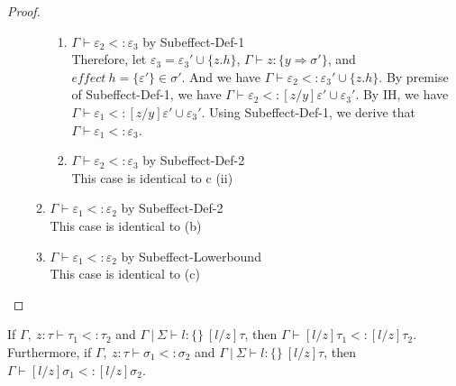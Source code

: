 \begin{proof}
\begin{enumerate}
\begin{enumerate}
\begin{enumerate}
        
        \item $\Gamma \vdash \varepsilon_2 <: \varepsilon_3$ by Subeffect-Def-1\\
        Therefore, let $\varepsilon_3 = \varepsilon_3' \cup \{z.h\}$, $\Gamma \vdash z:\{y \Rightarrow \sigma'\}$, and $effect\ h = \{\varepsilon'\} \in \sigma'$. And we have $\Gamma \vdash \varepsilon_2 <: \varepsilon_3' \cup \{z.h\}$. By premise of Subeffect-Def-1, we have $\Gamma \vdash \varepsilon_2 <: [z/y]\varepsilon'\cup\varepsilon_3'$. By IH, we have $\Gamma \vdash \varepsilon_1 <: [z/y]\varepsilon'\cup\varepsilon_3'$. Using Subeffect-Def-1, we derive that $\Gamma \vdash \varepsilon_1 <: \varepsilon_3$. 
        \item $\Gamma \vdash \varepsilon_2 <: \varepsilon_3$ by Subeffect-Def-2\\
        This case is identical to c (ii) 
    \end{enumerate}
    \item $\Gamma \vdash \varepsilon_1 <: \varepsilon_2$ by Subeffect-Def-2\\
    This case is identical to (b)
    \item $\Gamma \vdash \varepsilon_1 <: \varepsilon_2$ by Subeffect-Lowerbound\\
    This case is identical to (c)
\end{enumerate}

\end{enumerate}
\end{proof}



\begin{lemma}
If \mbox{$\Gamma,~z : \tau \vdash \tau_1 <:  \tau_2$} and \mbox{$\Gamma~|~\Sigma \vdash l : \{ \}~[l/z]\tau$}, then\linebreak
\mbox{$\Gamma \vdash [l/z]\tau_1 <: [l/z]\tau_2$}. Furthermore, if \mbox{$\Gamma,~z : \tau \vdash \sigma_1 <: \sigma_2$} and \mbox{$\Gamma~|~\Sigma \vdash l : \{ \}~[l/z]\tau$}, then\linebreak
\mbox{$\Gamma \vdash [l/z]\sigma_1 <: [l/z]\sigma_2$}.
\label{lemma-substitution-types}
\end{lemma}

